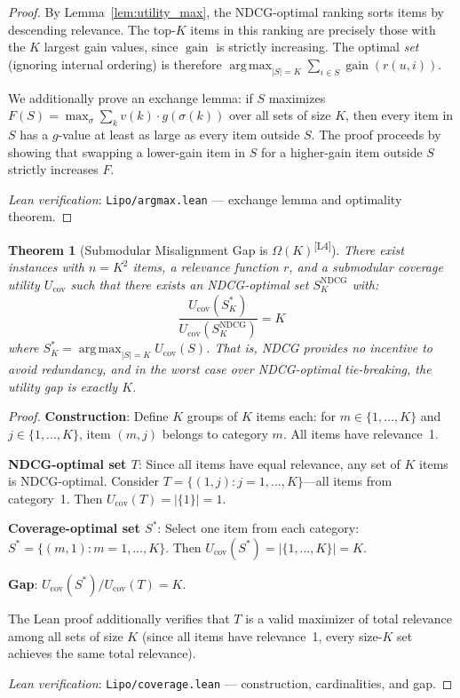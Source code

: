 \documentclass[11pt,a4paper]{article}
\theoremstyle{definition}
\theoremstyle{plain}
\newtheorem{theorem}{Theorem}[section]
\theoremstyle{remark}
\newcommand{\NDCG}{\mathrm{NDCG}}
\newcommand{\argmax}{\operatorname*{arg\,max}}
\DeclareMathOperator{\gain}{gain}
\newcommand{\leanmark}{\textsuperscript{\textcolor{green!50!black}{[L4]}}}
\begin{document}
\begin{proof}
By Lemma~\ref{lem:utility_max}, the NDCG-optimal ranking sorts items by descending relevance. The top-$K$ items in this ranking are precisely those with the $K$ largest gain values, since $\gain$ is strictly increasing. The optimal \emph{set} (ignoring internal ordering) is therefore $\argmax_{|S|=K} \sum_{i \in S} \gain(r(u,i))$.

We additionally prove an exchange lemma: if $S$ maximizes $F(S) = \max_\sigma \sum_k v(k) \cdot g(\sigma(k))$ over all sets of size $K$, then every item in $S$ has a $g$-value at least as large as every item outside $S$. The proof proceeds by showing that swapping a lower-gain item in $S$ for a higher-gain item outside $S$ strictly increases $F$.

\smallskip
\noindent\textit{Lean verification}: \texttt{Lipo/argmax.lean} --- exchange lemma and optimality theorem.
\end{proof}

\begin{theorem}[Submodular Misalignment Gap is $\Omega(K)$\leanmark]
\label{thm:submodular_misalign}
There exist instances with $n = K^2$ items, a relevance function $r$, and a submodular coverage utility $U_{\text{cov}}$ such that \emph{there exists} an NDCG-optimal set $S_K^{\NDCG}$ with:
\begin{equation}
    \frac{U_{\text{cov}}(S_K^*)}{U_{\text{cov}}(S_K^{\NDCG})} = K
\end{equation}
where $S_K^* = \argmax_{|S|=K} U_{\text{cov}}(S)$. That is, NDCG provides no incentive to avoid redundancy, and in the worst case over NDCG-optimal tie-breaking, the utility gap is exactly $K$.
\end{theorem}

\begin{proof}
\textbf{Construction}: Define $K$ groups of $K$ items each: for $m \in \{1, \ldots, K\}$ and $j \in \{1, \ldots, K\}$, item $(m, j)$ belongs to category $m$. All items have relevance~1.

\textbf{NDCG-optimal set $T$}: Since all items have equal relevance, any set of $K$ items is NDCG-optimal. Consider $T = \{(1, j) : j = 1, \ldots, K\}$---all items from category~1. Then $U_{\text{cov}}(T) = |\{1\}| = 1$.

\textbf{Coverage-optimal set $S^*$}: Select one item from each category: $S^* = \{(m, 1) : m = 1, \ldots, K\}$. Then $U_{\text{cov}}(S^*) = |\{1, \ldots, K\}| = K$.

\textbf{Gap}: $U_{\text{cov}}(S^*) / U_{\text{cov}}(T) = K$.

The Lean proof additionally verifies that $T$ is a valid maximizer of total relevance among all sets of size $K$ (since all items have relevance~1, every size-$K$ set achieves the same total relevance).

\smallskip
\noindent\textit{Lean verification}: \texttt{Lipo/coverage.lean} --- construction, cardinalities, and gap.
\end{proof}
\end{document}
